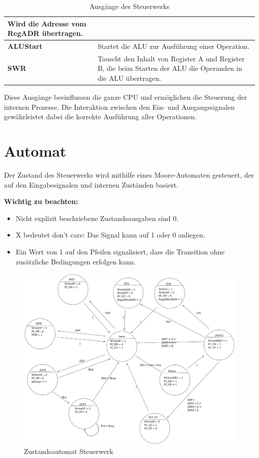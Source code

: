 \begin{table}[H]
\begin{tabular}{|l|p{10cm}|}
        Wird die Adresse vom RegADR übertragen.                                                                                                \\ \hline
        \textbf{ALUStart}    & Startet die ALU zur Ausführung einer Operation.                                                                 \\ \hline
        \textbf{SWR}         & Tauscht den Inhalt von Register A und Register B, die beim Starten der ALU die Operanden in die ALU übertragen. \\ \hline
    \end{tabular}
    \caption{Ausgänge des Steuerwerks}
\end{table}

Diese Ausgänge beeinflussen die ganze CPU und ermöglichen die Steuerung der internen Prozesse.
Die Interaktion zwischen den Ein- und Ausgangssignalen gewährleistet dabei die korrekte Ausführung aller Operationen.


\section{Automat}
Der Zustand des Steuerwerks wird mithilfe eines Moore-Automaten gesteuert, der auf den Eingabesignalen und internen Zuständen basiert.

\textbf{Wichtig zu beachten:}
\begin{itemize}
    \item Nicht explizit beschriebene Zustandsausgaben sind 0.
    \item X bedeutet don’t care: Das Signal kann auf 1 oder 0 anliegen.
    \item Ein Wert von 1 auf den Pfeilen signalisiert, dass die Transition ohne zusätzliche Bedingungen erfolgen kann.
\end{itemize}

\begin{figure}[H]
    \centering
    \includegraphics[scale=0.279]
    {content/figures/SW_Zustaende}
    \caption{Zustandsautomat Steuerwerk}
    \label{fig:SW_Zustaende}
\end{figure}


